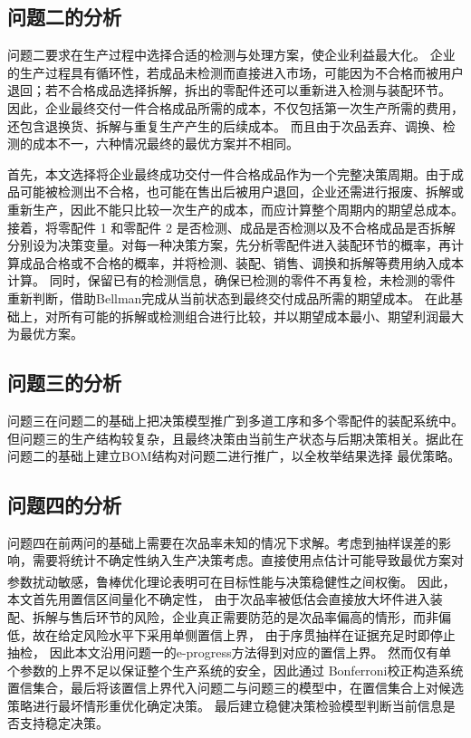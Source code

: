 \documentclass[withoutpreface,bwprint]{cumcmthesis}
\numberwithin{equation}{section}
\begin{document}
\subsection{问题二的分析}

问题二要求在生产过程中选择合适的检测与处理方案，使企业利益最大化。
企业的生产过程具有循环性，若成品未检测而直接进入市场，可能因为不合格而被用户退回；若不合格成品选择拆解，拆出的零配件还可以重新进入检测与装配环节。
因此，企业最终交付一件合格成品所需的成本，不仅包括第一次生产所需的费用，还包含退换货、拆解与重复生产产生的后续成本。
而且由于次品丢弃、调换、检测的成本不一，六种情况最终的最优方案并不相同。

首先，本文选择将企业最终成功交付一件合格成品作为一个完整决策周期。由于成品可能被检测出不合格，也可能在售出后被用户退回，企业还需进行报废、拆解或重新生产，因此不能只比较一次生产的成本，而应计算整个周期内的期望总成本。
接着，将零配件 1 和零配件 2 是否检测、成品是否检测以及不合格成品是否拆解分别设为决策变量。对每一种决策方案，先分析零配件进入装配环节的概率，再计算成品合格或不合格的概率，并将检测、装配、销售、调换和拆解等费用纳入成本计算。
同时，保留已有的检测信息，确保已检测的零件不再复检，未检测的零件重新判断，借助Bellman完成从当前状态到最终交付成品所需的期望成本。
在此基础上，对所有可能的拆解或检测组合进行比较，并以期望成本最小、期望利润最大为最优方案。

\subsection{问题三的分析}

问题三在问题二的基础上把决策模型推广到多道工序和多个零配件的装配系统中。
但问题三的生产结构较复杂，且最终决策由当前生产状态与后期决策相关。据此在问题二的基础上建立BOM结构对问题二进行推广，以全枚举结果选择
最优策略。



\subsection{问题四的分析}

问题四在前两问的基础上需要在次品率未知的情况下求解。考虑到抽样误差的影响，需要将统计不确定性纳入生产决策考虑。直接使用点估计可能导致最优方案对参数扰动敏感，鲁棒优化理论表明可在目标性能与决策稳健性之间权衡\textsuperscript{\cite{bertsimas2004}}。
因此，本文首先用置信区间量化不确定性，
由于次品率被低估会直接放大坏件进入装配、拆解与售后环节的风险，企业真正需要防范的是次品率偏高的情形，而非偏低，故在给定风险水平下采用单侧置信上界，
由于序贯抽样在证据充足时即停止抽检，
因此本文沿用问题一的e-progress方法得到对应的置信上界。
然而仅有单个参数的上界不足以保证整个生产系统的安全，因此通过 Bonferroni校正构造系统置信集合，最后将该置信上界代入问题二与问题三的模型中，在置信集合上对候选策略进行最坏情形重优化确定决策。
最后建立稳健决策检验模型判断当前信息是否支持稳定决策。
\end{document}

